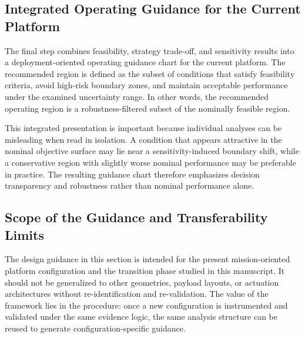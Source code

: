 
\subsection{Integrated Operating Guidance for the Current Platform}

The final step combines feasibility, strategy trade-off, and sensitivity results into a deployment-oriented operating guidance chart for the current platform. The recommended region is defined as the subset of conditions that satisfy feasibility criteria, avoid high-risk boundary zones, and maintain acceptable performance under the examined uncertainty range. In other words, the recommended operating region is a robustness-filtered subset of the nominally feasible region.

This integrated presentation is important because individual analyses can be misleading when read in isolation. A condition that appears attractive in the nominal objective surface may lie near a sensitivity-induced boundary shift, while a conservative region with slightly worse nominal performance may be preferable in practice. The resulting guidance chart therefore emphasizes decision transparency and robustness rather than nominal performance alone.


\subsection{Scope of the Guidance and Transferability Limits}

The design guidance in this section is intended for the present mission-oriented platform configuration and the transition phase studied in this manuscript. It should not be generalized to other geometries, payload layouts, or actuation architectures without re-identification and re-validation. The value of the framework lies in the procedure: once a new configuration is instrumented and validated under the same evidence logic, the same analysis structure can be reused to generate configuration-specific guidance.

